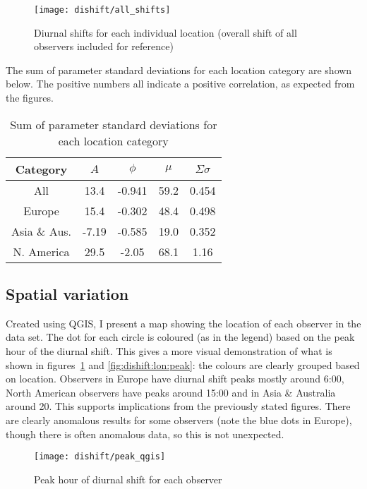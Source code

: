 \begin{figure}[h!]
	\centering
	\texttt{[image: dishift/all\_shifts]}
	\caption{Diurnal shifts for each individual location (overall shift of all observers included for reference)
		\label{fig:dishift:all}}
\end{figure}

The sum of parameter standard deviations for each location category are shown below. The positive numbers all indicate a positive correlation, as expected from the figures. 
\begin{table}[h!]
	\begin{tabular}{ccccc}
		\hline
		Category & $A$ & $\phi$ & $\mu$ & $\Sigma \sigma$ \\ \hline
		All & 13.4 & -0.941 & 59.2 & 0.454 \\
		Europe & 15.4 & -0.302 & 48.4 & 0.498 \\
		Asia \& Aus. & -7.19 & -0.585 & 19.0 & 0.352 \\
		N. America & 29.5 & -2.05 & 68.1 & 1.16 \\
		\hline
	\end{tabular}
	\caption{Sum of parameter standard deviations for each location category}
\end{table}

\subsection{Spatial variation}
Created using QGIS, I present a map showing the location of each observer in the data set. The dot for each circle is coloured (as in the legend) based on the peak hour of the diurnal shift. This gives a more visual demonstration of what is shown in figures~\ref{fig:dishift:all} and \ref{fig:dishift:lon:peak}: the colours are clearly grouped based on location. Observers in Europe have diurnal shift peaks mostly around 6:00, North American observers have peaks around 15:00 and in Asia \& Australia around 20. This supports implications from the previously stated figures. There are clearly anomalous results for some observers (note the blue dots in Europe), though there is often anomalous data, so this is not unexpected.
\begin{figure}[h!]
	\centering
	\texttt{[image: dishift/peak\_qgis]}
	\caption{Peak hour of diurnal shift for each observer
		\label{fig:dishift:qgis}}
\end{figure}
